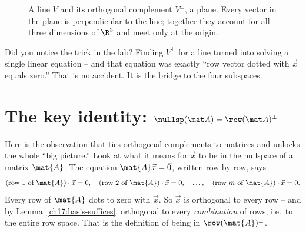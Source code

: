 \begin{figure}[H]
\centering
{}
\caption{A line $V$ and its orthogonal complement $V^{\perp}$, a plane. Every vector in the plane
is perpendicular to the line; together they account for all three dimensions of $\R^3$ and meet
only at the origin.}
\label{ch17:complement-pic}
\end{figure}

Did you notice the trick in the lab? Finding $V^\perp$ for a line turned into solving a single
linear equation -- and that equation was exactly ``row vector dotted with $\vec x$ equals zero.''
That is no accident. It is the bridge to the four subspaces.

\section{The key identity: \texorpdfstring{$\nullsp(\mat A)=\row(\mat A)^\perp$}{null A = row A perp}}

Here is the observation that ties orthogonal complements to matrices and unlocks the whole
``big picture.'' Look at what it means for $\vec{x}$ to be in the nullspace of a matrix
$\mat{A}$. The equation $\mat{A}\vec{x}=\vec{0}$, written row by row, says
\[
  (\text{row 1 of }\mat{A})\cdot\vec{x}=0,\quad
  (\text{row 2 of }\mat{A})\cdot\vec{x}=0,\quad\dots,\quad
  (\text{row }m\text{ of }\mat{A})\cdot\vec{x}=0.
\]
Every row of $\mat{A}$ dots to zero with $\vec{x}$. So $\vec{x}$ is orthogonal to every row -- and
by Lemma~\ref{ch17:basis-suffices}, orthogonal to every \emph{combination} of rows, i.e.\ to the
entire row space. That is the definition of being in $\row(\mat{A})^\perp$.

